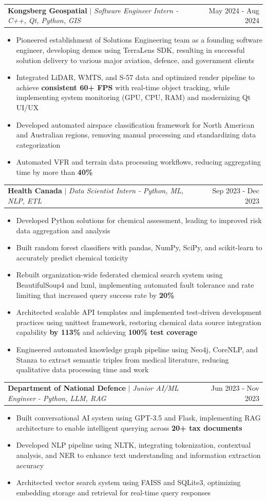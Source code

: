 \documentclass[letterpaper,11pt]{article}
\makeatletter
\newcommand{\resumeItem}[1]{
  \item\small{
    {#1 \vspace{-3.3pt}}
  }
}
\newcommand{\resumeSubheading}[3]{
    \item
    \begin{tabular*}{0.97\textwidth}[t]{l@{\extracolsep{\fill}}r}
      \textbf{#1} $|$ \textit{ #2} & #3 \\
    \end{tabular*}\vspace{-8.5pt}
}
\newcommand{\resumeItemListStart}{\begin{itemize}}
\newcommand{\resumeItemListEnd}{\end{itemize}\vspace{-5pt}}
\makeatother
\begin{document}
    \resumeSubheading{Kongsberg Geospatial}{Software Engineer Intern - C++, Qt, Python, GIS}{May 2024 - Aug 2024}
      \resumeItemListStart
        \resumeItem{Pioneered establishment of Solutions Engineering team as a founding software engineer, developing demos using TerraLens SDK, resulting in successful solution delivery to various major aviation, defence, and government clients}
        \resumeItem{Integrated LiDAR, WMTS, and S-57 data and optimized render pipeline to achieve \textbf{consistent 60+ FPS} with real-time object tracking, while implementing system monitoring (GPU, CPU, RAM) and modernizing Qt UI/UX}
        \resumeItem{Developed automated airspace classification framework for North American and Australian regions, removing manual processing and standardizing data categorization}
        \resumeItem{Automated VFR and terrain data processing workflows, reducing aggregating time by more than \textbf{40\%}}
      \resumeItemListEnd

    \resumeSubheading{Health Canada}{Data Scientist Intern - Python, ML, NLP, ETL}{Sep 2023 - Dec 2023}
      \resumeItemListStart
        \resumeItem{Developed Python solutions for chemical assessment, leading to improved risk data aggregation and analysis}
        \resumeItem{Built random forest classifiers with pandas, NumPy, SciPy, and scikit-learn to accurately predict chemical toxicity}
        \resumeItem{Rebuilt organization-wide federated chemical search system using BeautifulSoup4 and lxml, implementing automated fault tolerance and rate limiting that increased query success rate by \textbf{20\%}}
        \resumeItem{Architected scalable API templates and implemented test-driven development practices using unittest framework, restoring chemical data source integration capability \textbf{by 113\%} and achieving \textbf{100\% test coverage}}
        \resumeItem{Engineered automated knowledge graph pipeline using Neo4j, CoreNLP, and Stanza to extract semantic triples from medical literature, reducing qualitative data processing time and work}
      \resumeItemListEnd

    \resumeSubheading{Department of National Defence}{Junior AI/ML Engineer - Python, LLM, RAG}{Jun 2023 - Nov 2023}
      \resumeItemListStart
        \resumeItem{Built conversational AI system using GPT-3.5 and Flask, implementing RAG architecture to enable intelligent querying across \textbf{20+ tax documents}}
        \resumeItem{Developed NLP pipeline using NLTK, integrating tokenization, contextual analysis, and NER to enhance text understanding and information extraction accuracy}
        \resumeItem{Architected vector search system using FAISS and SQLite3, optimizing embedding storage and retrieval for real-time query responses}
      \resumeItemListEnd
\end{document}
